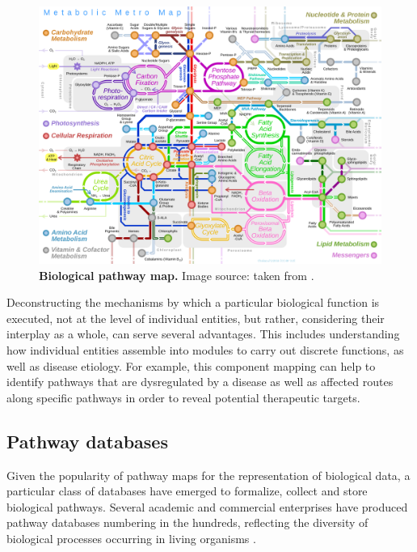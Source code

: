 {\footnotesize
\begin{figure}[ht]
	\centering
		\includegraphics[width=\linewidth]{figures/metro_map.png}
	\caption{\footnotesize \textbf{Biological pathway map.} Image source: taken from \parencite{chakazul2020}.}
    \label{pathways}
\end{figure}
}

Deconstructing the mechanisms by which a particular biological function is executed, not at the level of individual entities, but rather, considering their interplay as a whole, can serve several advantages. This includes understanding how individual entities assemble into modules to carry out discrete functions, as well as disease etiology. For example, this component mapping can help to identify pathways that are dysregulated by a disease as well as affected routes along specific pathways in order to reveal potential therapeutic targets.

\subsection{Pathway databases}

Given the popularity of pathway maps for the representation of biological data, a particular class of databases have emerged to formalize, collect and store biological pathways. Several academic and commercial enterprises have produced pathway databases numbering in the hundreds, reflecting the diversity of biological processes occurring in living organisms \parencite{bader2006}.

